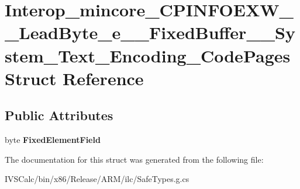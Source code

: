 \hypertarget{struct_interop__mincore___c_p_i_n_f_o_e_x_w_____lead_byte__e_____fixed_buffer_____system___text___encoding___code_pages}{}\section{Interop\+\_\+mincore\+\_\+\+C\+P\+I\+N\+F\+O\+E\+X\+W\+\_\+\+\_\+\+Lead\+Byte\+\_\+e\+\_\+\+\_\+\+Fixed\+Buffer\+\_\+\+\_\+\+System\+\_\+\+Text\+\_\+\+Encoding\+\_\+\+Code\+Pages Struct Reference}
\label{struct_interop__mincore___c_p_i_n_f_o_e_x_w_____lead_byte__e_____fixed_buffer_____system___text___encoding___code_pages}
\subsection*{Public Attributes}
\begin{DoxyCompactItemize}
\item 
\mbox{\label{struct_interop__mincore___c_p_i_n_f_o_e_x_w_____lead_byte__e_____fixed_buffer_____system___text___encoding___code_pages_aeab65ae2953c62142f25588e51e41938}} 
byte {\bfseries Fixed\+Element\+Field}
\end{DoxyCompactItemize}


The documentation for this struct was generated from the following file\+:\begin{DoxyCompactItemize}
\item 
I\+V\+S\+Calc/bin/x86/\+Release/\+A\+R\+M/ilc/Safe\+Types.\+g.\+cs\end{DoxyCompactItemize}

